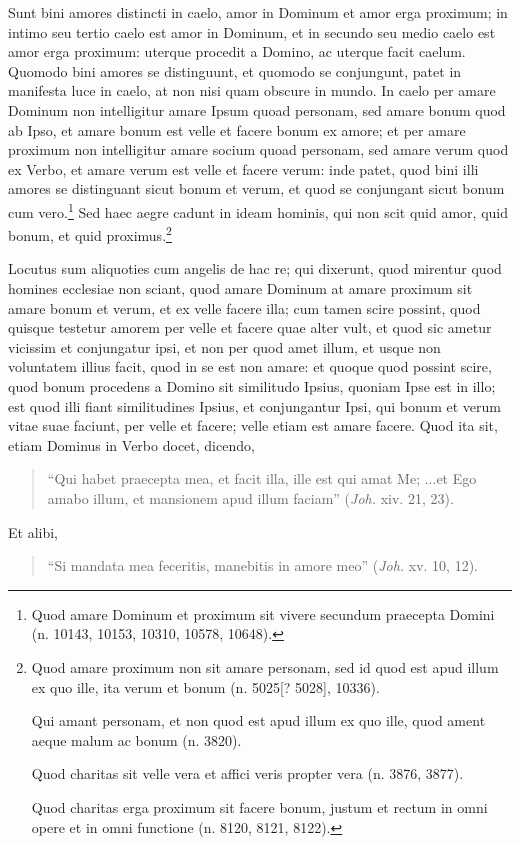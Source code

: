 \begin{topic}{15}
    Sunt bini amores distincti in caelo, amor in Dominum et amor erga proximum; in intimo seu tertio caelo est amor in
    Dominum, et in secundo seu medio caelo est amor erga proximum: uterque procedit a Domino, ac uterque facit caelum.
    Quomodo bini amores se distinguunt, et quomodo se conjungunt, patet in manifesta luce in caelo, at non nisi quam
    obscure in mundo.
    In caelo per amare Dominum non intelligitur amare Ipsum quoad personam, sed amare bonum quod ab Ipso, et amare bonum
    est velle et facere bonum ex amore; et per amare proximum non intelligitur amare socium quoad personam, sed amare
    verum quod ex Verbo, et amare verum est velle et facere verum: inde patet, quod bini illi amores se distinguant
    sicut bonum et verum, et quod se conjungant sicut bonum cum vero.\footnote{Quod amare Dominum et proximum sit vivere
    secundum praecepta Domini (n. 10143, 10153, 10310, 10578, 10648).}
    Sed haec aegre cadunt in ideam hominis, qui non scit quid amor, quid bonum, et quid proximus.\footnote{Quod amare
    proximum non sit amare personam, sed id quod est apud illum ex quo ille, ita verum et bonum (n. 5025[? 5028],
    10336).

    Qui amant personam, et non quod est apud illum ex quo ille, quod ament aeque malum ac bonum (n. 3820).

    Quod charitas sit velle vera et affici veris propter vera (n. 3876, 3877).

    Quod charitas erga proximum sit facere bonum, justum et rectum in omni opere et in omni functione (n. 8120, 8121,
    8122).}
\end{topic}

\begin{topic}{16}
    Locutus sum aliquoties cum angelis de hac re; qui dixerunt, quod mirentur quod homines ecclesiae non sciant, quod
    amare Dominum at amare proximum sit amare bonum et verum, et ex velle facere illa; cum tamen scire possint, quod
    quisque testetur amorem per velle et facere quae alter vult, et quod sic ametur vicissim et conjungatur ipsi, et non
    per quod amet illum, et usque non voluntatem illius facit, quod in se est non amare: et quoque quod possint scire,
    quod bonum procedens a Domino sit similitudo Ipsius, quoniam Ipse est in illo; est quod illi fiant similitudines
    Ipsius, et conjungantur Ipsi, qui bonum et verum vitae suae faciunt, per velle et facere; velle etiam est amare
    facere.
    Quod ita sit, etiam Dominus in Verbo docet, dicendo,
    \begin{quote}
        ``Qui habet praecepta mea, et facit illa, ille est qui amat Me; ...et Ego amabo illum, et mansionem apud illum
        faciam'' (\emph{Joh.} xiv. 21, 23).
    \end{quote}
    Et alibi,
    \begin{quote}
        ``Si mandata mea feceritis, manebitis in amore meo'' (\emph{Joh.} xv. 10, 12).
    \end{quote}
\end{topic}

